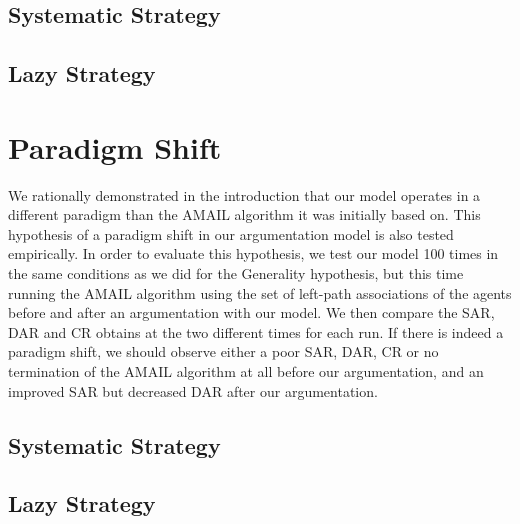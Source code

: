\subsection{Systematic Strategy}

\subsection{Lazy Strategy}

\section{Paradigm Shift}

We rationally demonstrated in the introduction that our model operates in a different paradigm than the AMAIL algorithm it was initially based on. This hypothesis of a paradigm shift in our argumentation model is also tested empirically. In order to evaluate this hypothesis, we test our model 100 times in the same conditions as we did for the Generality hypothesis, but this time running the AMAIL algorithm using the set of left-path associations of the agents before and after an argumentation with our model. We then compare the SAR, DAR and CR obtains at the two different times for each run. If there is indeed a paradigm shift, we should observe either a poor SAR, DAR, CR or no termination of the AMAIL algorithm at all before our argumentation, and an improved SAR but decreased DAR after our argumentation. 

\subsection{Systematic Strategy}




\subsection{Lazy Strategy}
